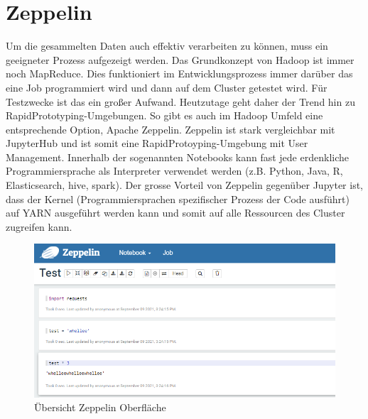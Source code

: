\documentclass[12pt,oneside,a4paper,parskip]{scrbook}
\begin{document}
\section{Zeppelin}
Um die gesammelten Daten auch effektiv verarbeiten zu k\"onnen, muss ein geeigneter Prozess aufgezeigt werden. Das Grundkonzept von Hadoop ist immer noch MapReduce. Dies funktioniert im Entwicklungsprozess immer dar\"uber das eine Job programmiert wird und dann auf dem Cluster getestet wird. F\"ur Testzwecke ist das ein großer Aufwand. Heutzutage geht daher  der Trend hin zu RapidPrototyping-Umgebungen. So gibt es auch im Hadoop Umfeld eine entsprechende Option, Apache Zeppelin. Zeppelin ist stark vergleichbar mit JupyterHub und ist somit eine RapidProtoyping-Umgebung mit User Management. Innerhalb der sogenannten Notebooks kann fast jede erdenkliche Programmiersprache als Interpreter verwendet werden (z.B. Python, Java, R, Elasticsearch, hive, spark). Der grosse Vorteil von Zeppelin gegen\"uber Jupyter ist, dass der Kernel (Programmiersprachen spezifischer Prozess der Code ausf\"uhrt) auf YARN ausgef\"uhrt werden kann und somit auf alle Ressourcen des Cluster zugreifen kann.
\begin{figure}[H]
	\centering
	\includegraphics[scale=0.6]{zeppelinOverview.png}
	\captionsetup{justification=centering}
	\caption{\"Ubersicht Zeppelin Oberfl\"ache}
	\label{pic:zeppelinOverview}
\end{figure}
\end{document}
